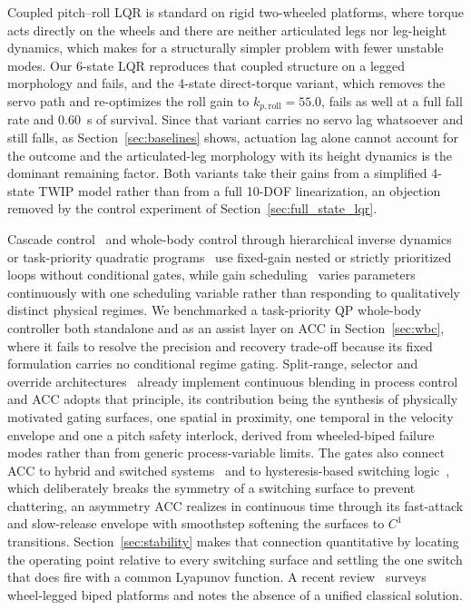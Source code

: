\documentclass[a4paper,fleqn]{cas-dc}
\begin{document}
Coupled pitch--roll LQR is standard on rigid two-wheeled platforms, where torque
acts directly on the wheels and there are neither articulated legs nor
leg-height dynamics, which makes for a structurally simpler problem with fewer
unstable modes. Our 6-state LQR reproduces that coupled structure on a legged
morphology and fails, and the 4-state direct-torque variant, which removes the
servo path and re-optimizes the roll gain to $k_{p,\text{roll}}{=}55.0$, fails as
well at a full fall rate and \SI{0.60}{s} of survival. Since that variant carries
no servo lag whatsoever and still falls, as Section~\ref{sec:baselines} shows,
actuation lag alone cannot account for the outcome and the articulated-leg
morphology with its height dynamics is the dominant remaining factor. Both
variants take their gains from a simplified 4-state TWIP model rather than from a
full 10-DOF linearization, an objection removed by the control experiment of
Section~\ref{sec:full_state_lqr}.

Cascade control~\cite{cascade_standard} and whole-body control through
hierarchical inverse dynamics or task-priority quadratic
programs~\cite{herzog2016wbc,bellicoso2018wbc,escande2014hqp} use fixed-gain
nested or strictly prioritized loops without conditional gates, while gain
scheduling~\cite{gain_scheduling_survey,leith2000gainsched} varies parameters
continuously with one scheduling variable rather than responding to
qualitatively distinct physical regimes. We benchmarked a task-priority QP
whole-body controller both standalone and as an assist layer on ACC in
Section~\ref{sec:wbc}, where it fails to resolve the precision and recovery
trade-off because its fixed formulation carries no conditional regime gating.
Split-range, selector and override
architectures~\cite{shinskey1996,astrom2005advanced} already implement continuous
blending in process control and ACC adopts that principle, its contribution being
the synthesis of physically motivated gating surfaces, one spatial in proximity,
one temporal in the velocity envelope and one a pitch safety interlock, derived
from wheeled-biped failure modes rather than from generic process-variable
limits. The gates also connect ACC to hybrid and switched
systems~\cite{liberzon2003switching} and to hysteresis-based switching
logic~\cite{hespanha2003hysteresis}, which deliberately breaks the symmetry of a
switching surface to prevent chattering, an asymmetry ACC realizes in continuous
time through its fast-attack and slow-release envelope with smoothstep softening
the surfaces to $C^1$ transitions. Section~\ref{sec:stability} makes that
connection quantitative by locating the operating point relative to every
switching surface and settling the one switch that does fire with a common
Lyapunov function. A recent review~\cite{liu2024review} surveys wheel-legged
biped platforms and notes the absence of a unified classical solution.
\end{document}
